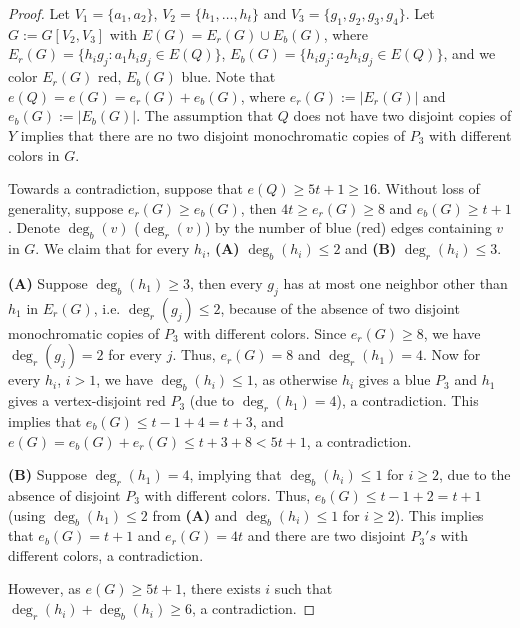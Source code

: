 \documentclass[11pt, reqno]{amsart}    	%
\theoremstyle{definition}
\newcommand{\red}[1]{\textcolor[rgb]{0.93,0.08,0.17}{#1}}    %
\numberwithin{equation}{section}
\begin{document}
	\begin{proof}
		
		Let $ V_{1}=\{a_{1},a_{2}\}$, $V_{2}=\{h_{1},\dots,h_t\}$ and $V_{3}=\{g_{1},g_{2},g_{3},g_4\}$. 
		Let $G:=G[V_{2},V_{3}]$ with $ E(G)=E_r(G)\cup E_b(G) $, where $ E_r(G)=\{h_ig_j:a_{1}h_ig_j\in E(Q)\}$, $E_b(G)=\{h_ig_j:a_{2}h_ig_j\in E(Q)\}$, and we color $ E_r(G) $ red, $ E_b(G) $ blue. Note that $ e(Q)=e(G)=e_r(G)+e_b(G)$, where $e_r(G):=|E_r(G)|$ and $e_b(G):=|E_b(G)|$. 
		The assumption that $ Q $ does not have two disjoint copies of $Y$ implies that there are no two disjoint  monochromatic copies of  $ P_3 $ with different colors in $G$.
		
		Towards a contradiction, suppose that $e(Q)\ge 5t+1\ge 16$. 	Without loss of generality,  suppose  $e_r(G)\ge e_b(G)$, then $ 4t \ge e_r(G) \ge8$ and $ e_b(G) \ge t+1$.	
		Denote $\deg_b(v)$ ($\deg_r(v)$) by the number of blue (red) edges containing $ v $ in $ G $. 
		We claim that for every $h_i$, \textbf{(A)} $\deg_{b}(h_i)\le 2$ and \textbf{(B)} $\deg_{r}(h_i)\le3$.
		
		\textbf{(A)} Suppose  $\deg_{b}(h_1) \ge 3$, 
		then every $g_j$ has at most one neighbor other than $h_1$ in $ E_r(G) $, i.e. $\deg_{r}(g_j)\le2$, because of the absence of two disjoint  monochromatic copies of $ P_3 $ with different colors. 
		Since $ e_r(G) \ge8 $, we have $\deg_{r}(g_j)=2$ for every $j$. 
		Thus, $ e_r(G)=8 $ and  $\deg_{r}(h_1)=4$. 
		Now for every $h_i$, $i>1$, we have $\deg_{b}(h_i)\le1$, %
		as otherwise $h_i$ gives a blue $P_3$ and $h_1$ gives a vertex-disjoint red $P_3$ (due to $\deg_{r}(h_1)=4$), a contradiction.
		This implies that $ e_b(G) \le t-1+4=t+3 $, and $e(G)=e_b(G)+e_r(G)\le t+3+8<5t+1$, a contradiction.
		
		\textbf{(B)} Suppose $\deg_{r}(h_1)=4$, implying that $\deg_b(h_i)\le 1$ for $i\ge 2$, due to the absence of disjoint $P_3$ with different colors.
		Thus, $ e_b(G) \le t-1+2=t+1$ (using $\deg_b(h_1)\le 2$ from \textbf{(A)} and $\deg_b(h_i)\le 1$ for $i\ge 2$). 
		This implies that $e_b(G)=t+1$ and $e_r(G)=4t$ and there are two disjoint $P_3's$ with different colors, a contradiction.
		
		However, as $e(G)\ge5t+1$, there exists $i$ such that $\deg_{r}(h_i)+\deg_{b}(h_i)\ge6$, a contradiction.
	\end{proof}
	
\end{document}
